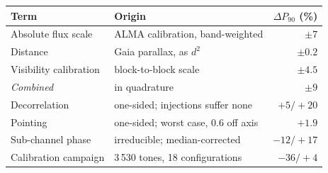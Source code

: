 \begin{tabular}{@{}l@{~}l@{~}r@{}}
\hline
Term & Origin & $\Delta P_{90}$ (\%) \\
\hline
Absolute flux scale & ALMA calibration, band-weighted & $\pm7$ \\
Distance & Gaia parallax, as $d^{2}$ & $\pm0.2$ \\
Visibility calibration & block-to-block scale & $\pm4.5$ \\
\hline
\emph{Combined} & in quadrature & $\pm9$ \\
\hline
Decorrelation & one-sided; injections suffer none & $+5/+20$ \\
Pointing & one-sided; worst case, 0.6\arcsec{} off axis & $+1.9$ \\
Sub-channel phase & irreducible; median-corrected & $-12/+17$ \\
Calibration campaign & 3\,530 tones, 18 configurations & $-36/+4$ \\
\hline
\end{tabular}

